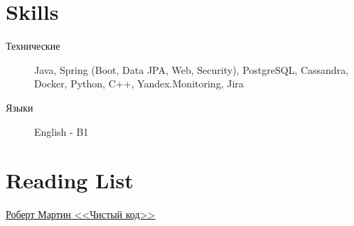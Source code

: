 \documentclass[11pt]{article}
\begin{document}
\begin{comment}
\subsection{\href{https://github.com/PaaavelZ/tinkoff_bot}{\underline{Pet-project}} $|$ {\normalfont\textit{Python Developer}} \hfill June 2022 -- July 2022}
\subsubsection{\underline{\textbf{Stack}: Python, \href{https://github.com/python-telegram-bot/python-telegram-bot}{Telegram API}, SQLite, \href{https://github.com/Tinkoff/invest-python}{Tinkoff API}}}
\subsubsection{I developed \href{https://github.com/PaaavelZ/tinkoff_bot}{\underline{a Telegram financial bot}} for personal use. In more detail what did I do:}
\begin{itemize}
    \item I created \textbf{a SQLite database class interface} to organize and access all application data
    \item I implemented \textbf{the forming and sending aggregated reports} of \href{https://www.tinkoff.ru/invest/}{\underline{the Tinkoff Invest's}} daily trade statistics for chosen accounts as well as the Tinkoff Investment App but it is available only for a month officially
    \item I also added the \textbf{subscription's capabilities} to be able to independently write to the bot and receive personal reports from it
\end{itemize}
\end{comment}

\section{Skills}
\begin{description}
    \item[Технические] Java, Spring (Boot, Data JPA, Web, Security), PostgreSQL, Cassandra, Docker, Python, C++, Yandex.Monitoring, Jira
    \item[Языки] English - B1
\end{description}

\section{Reading List}
\begin{description}
    \item \href{https://www.amazon.com/Clean-Code-Handbook-Software-Craftsmanship/dp/0132350882}{\underline{Роберт Мартин <<Чистый код>>}}
\end{description}
\end{document}
